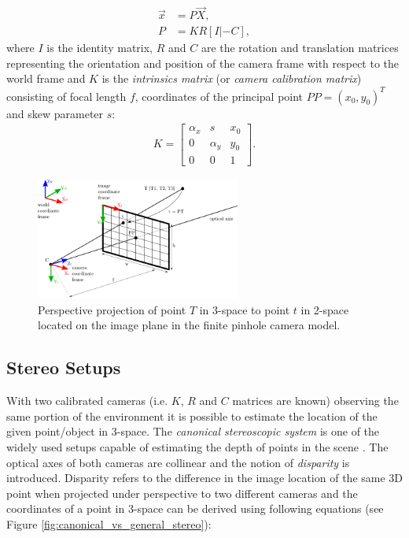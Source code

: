 \begin{align}
	\vec{x} &= P\vec{X},\\
	P &= KR[I|-C],
\end{align}
where $I$ is the identity matrix, $R$ and $C$ are the rotation and translation matrices representing the orientation and position of the camera frame with respect to the world frame and $K$ is the \textit{intrinsics matrix} (or \textit{camera calibration matrix}) consisting of focal length $f$, coordinates of the principal point $PP = (x_{0}, y_{0})^{T}$ and skew parameter $s$:
\begin{align}
	K = \begin{bmatrix}
		\alpha_{x} & s          & x_{0} \\
		0          & \alpha_{y} & y_{0} \\
		0          & 0			& 1
	\end{bmatrix}.
\end{align}

\begin{figure}[tbh]
	\centering
	\includegraphics[width=0.60\textwidth]{fig/pinhole_camera.pdf}
	\caption{Perspective projection of point $T$ in 3-space to point $t$ in 2-space located on the image plane in the finite pinhole camera model.}
	\label{fig:pinhole_camera}
\end{figure}

\subsection{Stereo Setups}

With two calibrated cameras (i.e. $K$, $R$ and $C$ matrices are known) observing the same portion of the environment it is possible to estimate the location of the given point/object in 3-space. The \textit{canonical stereoscopic system} is one of the widely used setups capable of estimating the depth of points in the scene \cite{Cyganek:2007:ICV:1214366}. The optical axes of both cameras are collinear and the notion of \textit{disparity} is introduced. Disparity refers to the difference in the image location of the same 3D point when projected under perspective to two different cameras \cite{Stockman:2001:CV:558008} and the coordinates of a point in 3-space can be derived using following equations (see Figure \ref{fig:canonical_vs_general_stereo}):

